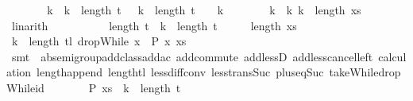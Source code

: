 \begin{isabellebody}
\ \ \ \ \isamarkupfalse%
\ \isamarkupfalse%
\ {\isachardoublequoteopen}k{}\ {\isacharless}\ k{\isacharprime}\ {\isacharminus}\ {\isacharparenleft}length\ {\isacharquery}t\ {\isacharplus}\ {}{\isacharparenright}{\isachardoublequoteclose}\ {\isachardoublequoteopen}k{\isacharprime}\ {\isacharminus}\ {\isacharparenleft}length\ {\isacharquery}t\ {\isacharplus}\ {}{\isacharparenright}\ {\isacharless}\ k{}{\isachardoublequoteclose}\isanewline
\ \ \ \ \ \ \isamarkupfalse%
\ {\isacharbackquoteopen}k{}\ {\isacharless}\ k{}{\isacharbackquoteclose}\ {\isacharbackquoteopen}k{}\ {\isacharless}\ length\ {\isacharquery}xs{\isacharbackquoteclose}\isanewline
\ \ \ \ \ \ \isamarkupfalse%
\ linarith{\isacharplus}\isanewline
\ \ \ \ \isamarkupfalse%
\isanewline
\ \ \ \ \isamarkupfalse%
\ {\isachardoublequoteopen}length\ {\isacharquery}t\ {\isacharplus}\ {\isacharparenleft}k{\isacharprime}\ {\isacharminus}\ {\isacharparenleft}length\ {\isacharquery}t\ {\isacharplus}\ {}{\isacharparenright}{\isacharparenright}\ {\isacharplus}\ {}\ {\isacharless}\ length\ xs{\isachardoublequoteclose}\isanewline
\ \ \ \ \ \ \isamarkupfalse%
\ {\isacartoucheopen}k{}\ {\isacharless}\ length\ {\isacharparenleft}tl\ {\isacharparenleft}dropWhile\ {\isacharparenleft}{\isasymlambda}x{\isachardot}\ {\isasymnot}\ P\ x{\isacharparenright}\ xs{\isacharparenright}{\isacharparenright}{\isacartoucheclose}\isanewline
\ \ \ \ \ \ \isamarkupfalse%
\ {\isacharparenleft}smt\ \ ab{\isacharunderscore}semigroup{\isacharunderscore}add{\isacharunderscore}class{\isachardot}add{\isacharunderscore}ac{\isacharparenleft}{}{\isacharparenright}\ add{\isachardot}commute\ add{\isacharunderscore}lessD{}\ add{\isacharunderscore}less{\isacharunderscore}cancel{\isacharunderscore}left\ calculation{\isacharparenleft}{}{\isacharparenright}\ length{\isacharunderscore}append\ length{\isacharunderscore}tl\ less{\isacharunderscore}diff{\isacharunderscore}conv\ less{\isacharunderscore}trans{\isacharunderscore}Suc\ plus{\isacharunderscore}{}{\isacharunderscore}eq{\isacharunderscore}Suc\ takeWhile{\isacharunderscore}dropWhile{\isacharunderscore}id{\isacharparenright}\isanewline
\ \ \ \ \isamarkupfalse%
\ \isamarkupfalse%
\ {\isachardoublequoteopen}P\ {\isacharparenleft}{\isacharquery}xs\ {\isacharbang}\ {\isacharparenleft}k{\isacharprime}\ {\isacharminus}\ {\isacharparenleft}length\ {\isacharquery}t\ {\isacharplus}\ {}{\isacharparenright}{\isacharparenright}{\isacharparenright}{\isachardoublequoteclose}\isanewline

\end{isabellebody}
